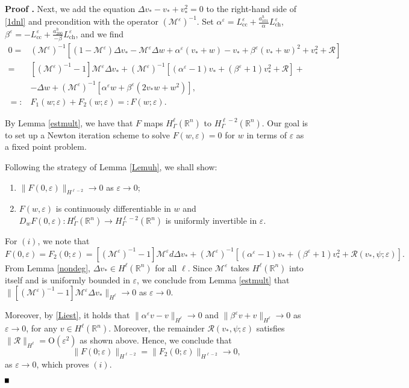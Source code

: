 \documentclass[10pt]{article}
\newenvironment{Proof}[1][\unskip]%
 {\begin{trivlist} \item[]{\bf Proof #1. }}%
 {\hspace*{\fill}$\rule{.4\baselineskip}{.4\baselineskip}$\end{trivlist}}
\newcommand{\R}{\mathbb{R}}
\newcommand{\rmO}{\mathrm{O}}
\newcommand{\eps}{\varepsilon}
\newcommand{\M}{\mathcal{M}}
\newcommand{\Rm}{\mathcal{R}}
\begin{document}
\begin{Proof}
Next, we add the equation $\Delta v_*-v_*+v_*^2 =0$ to the right-hand side of \eqref{1dnl} and precondition with the operator $(\M^{\eps})^{-1}$. Set $\alpha^\eps = L_\mathrm{cc}^\eps + \frac{a_{101}^h}{\alpha} L_\mathrm{ch}^\eps $, $\beta^\eps=-L_\mathrm{cc}^\eps +\frac{a_{200}^h}{-\beta} L_\mathrm{ch}^\eps $, and we find
\begin{align}
0 =&(\M^\eps)^{-1}\left[ (1-\M^\eps)\Delta v_* -\M^\eps \Delta w+\alpha^\eps(v_*+w)-v_*+\beta^\eps(v_*+w)^2+v_*^2 + \Rm \right] \nonumber \\ 
=& [(\M^{\eps})^{-1}-1]\M^\eps \Delta v_*+(\M^{\eps})^{-1}\left[ (\alpha^\eps-1)v_*+(\beta^\eps+1)v_*^2+\Rm \right]+ \nonumber \\
&-\Delta w+(\M^{\eps})^{-1}\left[\alpha^\eps w+\beta^\eps(2v_*w+w^2)\right], \nonumber \\
=: &F_1(w;\eps)+F_2(w;\eps)=: F(w;\eps).  \label{splfynl}
\end{align}

By Lemma \ref{estmult}, we have that $F$ maps $H^\ell_{\Gamma}(\R^n)$ to $H_{\Gamma}^{\ell-2}(\R^n)$. Our goal is to set up a Newton iteration scheme to solve $ F(w,\eps) =0$ for $w$ in terms of $\eps$ as a fixed point problem.

Following the strategy of Lemma \ref{Lemuh}, we shall show:
\begin{enumerate}
\item $\|F(0,\eps)\|_{H^{\ell-2}} \to 0$ as $\eps \to 0$;
\item $F(w,\eps)$ is continuously differentiable in $w$ and $D_wF(0,\eps): H^{\ell}_{\Gamma}(\R^n) \to H^{\ell-2}_{\Gamma}(\R^n)$ is uniformly invertible in $\eps$.
\end{enumerate}
For $(i)$, we note that
\[
F(0,\eps) = F_2(0;\eps) = [(\M^{\eps})^{-1}-1]\M^\eps d \Delta v_*+(\M^\eps)^{-1}[(\alpha^\eps-1)v_*+(\beta^\eps+1)v_*^2+\Rm(v_*,\psi;\eps)].
\]
From Lemma \ref{nondeg}, $\Delta v_* \in H^\ell(\R^n)$ for all $\ell$. Since $\M^\eps$ takes $H^\ell(\R^n)$ into itself and is uniformly bounded in $\eps$, we conclude from Lemma \ref{estmult} that 
$\|[(\M^{\eps})^{-1}-1]\M^\eps  \Delta v_* \|_{H^\ell} \to 0$
as $\eps \to 0$.

Moreover, by  \eqref{Liest}, it holds that $\| \alpha^\eps v -v\|_{H^\ell} \to 0$ and $\| \beta^\eps v + v\|_{H^\ell} \to 0$ as $\eps \to 0$, for any $v \in H^\ell(\R^n)$. Moreover, the remainder $\Rm(v_*,\psi;\eps)$ satisfies $\|\Rm\|_{H^\ell} = \rmO(\eps^2)$ as shown above. Hence, we conclude that 
\[
\| F(0;\eps)\|_{H^{\ell-2}} = \| F_2(0;\eps)\|_{H^{\ell-2} }\to 0,
\]
as $\eps \to 0$, which proves $(i)$.


\end{Proof}
\end{document}
